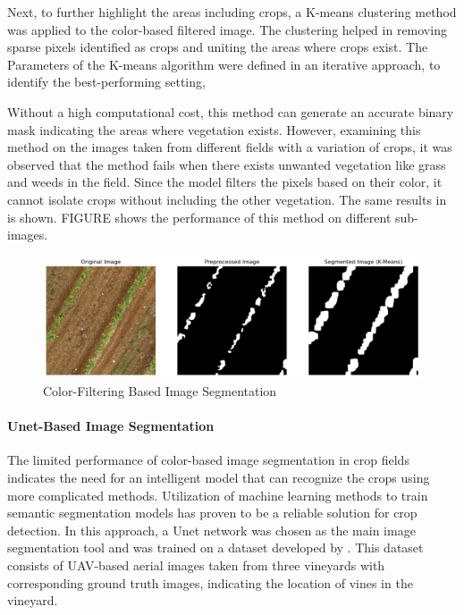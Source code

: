 \documentclass[conference]{IEEEtran}
\begin{document}
Next, to further highlight the areas including crops, a K-means clustering method was applied to the color-based filtered image. The clustering helped in removing sparse pixels identified as crops and uniting the areas where crops exist. The Parameters of the K-means algorithm were defined in an iterative approach, to identify the best-performing setting, 

Without a high computational cost, this method can generate an accurate binary mask indicating the areas where vegetation exists. However, examining this method on the images taken from different fields with a variation of crops, it was observed that the method fails when there exists unwanted vegetation like grass and weeds in the field. Since the model filters the pixels based on their color, it cannot isolate crops without including the other vegetation. The same results in 
\cite{b5} is shown.
FIGURE shows the performance of this method on different sub-images.


\begin{figure}[b]
\centering
\includegraphics[width=\linewidth]{Kmeans.png}
\caption{Color-Filtering Based Image Segmentation}
\label{fig2:kmeans}
\end{figure}\hfill


\paragraph{Unet-Based Image Segmentation}
The limited performance of color-based image segmentation in crop fields indicates the need for an intelligent model that can recognize the crops using more complicated methods. Utilization of machine learning methods to train semantic segmentation models has proven to be a reliable solution for crop detection. In this approach, a Unet network was chosen as the main image segmentation tool and was trained on a dataset developed by
\cite{b5}
. This dataset consists of UAV-based aerial images taken from three vineyards with corresponding ground truth images, indicating the location of vines in the vineyard.
\end{document}
